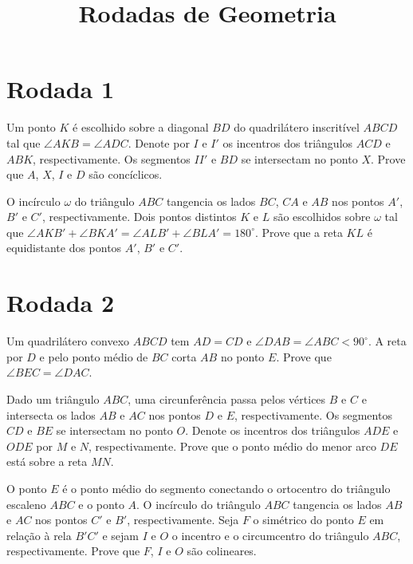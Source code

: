 \documentclass[12pt, a4paper]{article}
\title{Rodadas de Geometria}
\author{} %
\begin{document}
	
	\zeustitle
	\section{Rodada 1}
	\begin{prob}[Rússia 2008]
		Um ponto $K$ é escolhido sobre a diagonal $BD$ do quadrilátero inscritível $ABCD$ tal que $\angle AKB = \angle ADC$. Denote por $I$ e $I'$ os incentros dos triângulos $ACD$ e $ABK$, respectivamente. Os segmentos $II'$ e $BD$ se intersectam no ponto $X$. Prove que $A$, $X$, $I$ e $D$ são concíclicos.
	\end{prob}
	\begin{prob}[Rússia 2008]
		O incírculo $\omega$ do triângulo $ABC$ tangencia os lados $BC$, $CA$ e $AB$ nos pontos $A'$, $B'$ e $C'$, respectivamente. Dois pontos distintos $K$ e $L$ são escolhidos sobre $\omega$ tal que $\angle AKB' + \angle BKA' = \angle ALB' + \angle BLA' = 180^\circ$. Prove que a reta $KL$ é equidistante dos pontos $A'$, $B'$ e $C'$.
	\end{prob}

	\section{Rodada 2}
	\begin{prob}[Bulgária 1998] %
		Um quadrilátero convexo $ABCD$ tem $AD = CD$ e $\angle DAB = \angle ABC < 90^\circ$. A reta por $D$ e pelo ponto médio de $BC$ corta $AB$ no ponto $E$. Prove que $\angle BEC = \angle DAC$.
	\end{prob}
	\begin{prob}[Rússia 2007]
		Dado um triângulo $ABC$, uma circunferência passa pelos vértices $B$ e $C$ e intersecta os lados $AB$ e $AC$ nos pontos $D$ e $E$, respectivamente. Os segmentos $CD$ e $BE$ se intersectam no ponto $O$. Denote os incentros dos triângulos $ADE$ e $ODE$ por $M$ e $N$, respectivamente. Prove que o ponto médio do menor arco $DE$ está sobre a reta $MN$.
	\end{prob}
	\begin{prob}[Rússia 2012]
		O ponto $E$ é o ponto médio do segmento conectando o ortocentro do triângulo escaleno $ABC$ e o ponto $A$. O incírculo do triângulo $ABC$ tangencia os lados $AB$ e $AC$ nos pontos $C'$ e $B'$, respectivamente. Seja $F$ o simétrico do ponto $E$ em relação à rela $B'C'$ e sejam $I$ e $O$ o incentro e o circumcentro do triângulo $ABC$, respectivamente. Prove que $F$, $I$ e $O$ são colineares.
	\end{prob}
\end{document}
